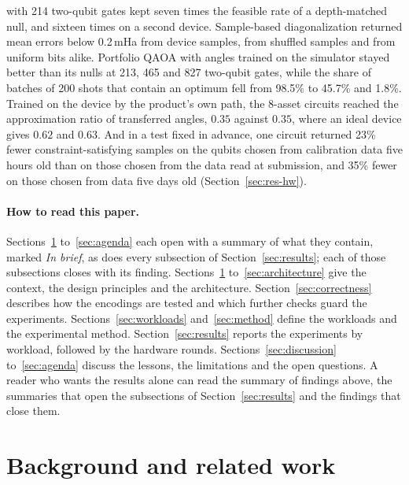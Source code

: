 \documentclass[11pt,a4paper]{article}
\begin{document}
\begin{itemize}
        with 214 two-qubit gates kept seven times the feasible rate of a
        depth-matched null, and sixteen times on a second device.
        Sample-based diagonalization returned mean
        errors below 0.2\,mHa from device samples, from shuffled samples and
        from uniform bits alike. Portfolio QAOA with angles trained on the
        simulator stayed better than its nulls at 213, 465 and 827 two-qubit
        gates, while the share of batches of 200 shots that contain an
        optimum fell from 98.5\% to 45.7\% and 1.8\%. Trained on the device
        by the product's own path, the 8-asset circuits reached the
        approximation ratio of transferred angles, $0.35$ against $0.35$,
        where an ideal device gives $0.62$ and $0.63$. And in a test fixed
        in advance, one circuit returned 23\% fewer constraint-satisfying
        samples on the qubits chosen from calibration data five hours old
        than on those chosen from the data read at submission, and 35\%
        fewer on those chosen from data five days old
        (Section~\ref{sec:res-hw}).
\end{itemize}

\paragraph{How to read this paper.} Sections~\ref{sec:related}
to~\ref{sec:agenda} each open with a summary of what they contain, marked
\emph{In brief}, as does every subsection of Section~\ref{sec:results}; each
of those subsections closes with its finding.
Sections~\ref{sec:related} to~\ref{sec:architecture} give the context, the
design principles and the architecture. Section~\ref{sec:correctness}
describes how the encodings are tested and which further checks guard the
experiments. Sections~\ref{sec:workloads}
and~\ref{sec:method} define the workloads and the experimental method.
Section~\ref{sec:results} reports the experiments by workload, followed by
the hardware rounds.
Sections~\ref{sec:discussion} to~\ref{sec:agenda} discuss the lessons, the
limitations and the open questions. A reader who wants the results alone can
read the summary of findings above, the summaries that open the subsections
of Section~\ref{sec:results} and the findings that close them.

\section{Background and related work}
\label{sec:related}
\end{document}
